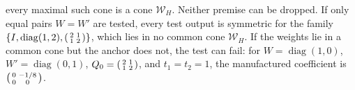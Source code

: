 every maximal such cone is a cone \(\mathcal W_H\). Neither premise can be
dropped. If only equal pairs \(W=W'\) are tested, every test output is
symmetric for the family
\(\{I,\operatorname{diag}(1,2),\begin{psmallmatrix}2&1\\1&2\end{psmallmatrix}\}\),
which lies in no common cone \(\mathcal W_H\). If the weights lie in a common
cone but the anchor does not, the test can fail: for
\(W=\operatorname{diag}(1,0)\), \(W'=\operatorname{diag}(0,1)\),
\(Q_0=\begin{psmallmatrix}2&1\\1&2\end{psmallmatrix}\), and \(t_1=t_2=1\), the
manufactured coefficient is
\(\begin{psmallmatrix}0&-1/8\\0&0\end{psmallmatrix}\). 

